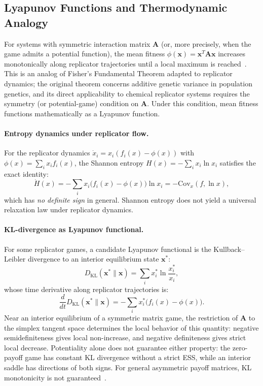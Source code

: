 \documentclass[12pt,a4paper]{article}
\theoremstyle{remark}
\begin{document}
\subsection{Lyapunov Functions and Thermodynamic Analogy}

For systems with symmetric interaction matrix $\mathbf{A}$ (or, more precisely, when the game admits a potential function), the mean fitness $\phi(\mathbf{x}) = \mathbf{x}^T \mathbf{A} \mathbf{x}$ increases monotonically along replicator trajectories until a local maximum is reached~\citep{ReplicatorEntropy}. This is an analog of Fisher's Fundamental Theorem adapted to replicator dynamics; the original theorem concerns additive genetic variance in population genetics, and its direct applicability to chemical replicator systems requires the symmetry (or potential-game) condition on $\mathbf{A}$. Under this condition, mean fitness functions mathematically as a Lyapunov function.

\paragraph{Entropy dynamics under replicator flow.}
For the replicator dynamics $\dot{x}_i = x_i(f_i(x) - \phi(x))$ with $\phi(x) = \sum_i x_i f_i(x)$, the Shannon entropy $H(x) = -\sum_i x_i \ln x_i$ satisfies the exact identity:
\begin{equation}
\dot{H}(x) = -\sum_i x_i \big(f_i(x) - \phi(x)\big) \ln x_i = -\mathrm{Cov}_x(f, \ln x),
\end{equation}
which has \emph{no definite sign} in general. Shannon entropy does not yield a universal relaxation law under replicator dynamics.

\paragraph{KL-divergence as Lyapunov functional.}
For some replicator games, a candidate Lyapunov functional is the Kullback--Leibler divergence to an interior equilibrium state $\mathbf{x}^*$:
\begin{equation}
D_{\mathrm{KL}}(\mathbf{x}^* \| \mathbf{x}) = \sum_i x_i^* \ln \frac{x_i^*}{x_i},
\end{equation}
whose time derivative along replicator trajectories is:
\begin{equation}
\frac{d}{dt} D_{\mathrm{KL}}(\mathbf{x}^* \| \mathbf{x}) = -\sum_i x_i^* \big(f_i(x) - \phi(x)\big).
\end{equation}
Near an interior equilibrium of a symmetric matrix game, the restriction of $\mathbf{A}$ to the simplex tangent space determines the local behavior of this quantity: negative semidefiniteness gives local non-increase, and negative definiteness gives strict local decrease. Potentiality alone does not guarantee either property: the zero-payoff game has constant KL divergence without a strict ESS, while an interior saddle has directions of both signs. For general asymmetric payoff matrices, KL monotonicity is not guaranteed~\citep{HofbauerSigmund1998,ReplicatorEntropy}.
\end{document}
